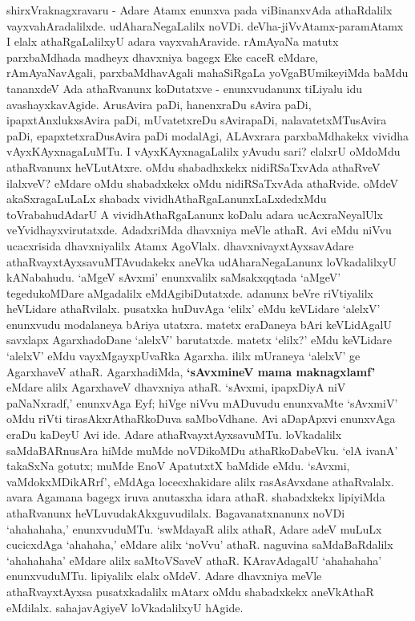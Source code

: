 shirxVraknagxravaru - Adare Atamx enunxva pada viBinanxvAda athaRdalilx vayxvahAradalilxde. udAharaNegaLalilx noVDi. deVha-jiVvAtamx-paramAtamx I elalx athaRgaLalilxyU adara vayxvahAravide. rAmAyaNa matutx parxbaMdhada madheyx dhavxniya bagegx Eke caceR eMdare, rAmAyaNavAgali, parxbaMdhavAgali mahaSiRgaLa yoVgaBUmikeyiMda baMdu tananxdeV Ada athaRvanunx koDutatxve - enunxvudanunx tiLiyalu idu avashayxkavAgide. ArusAvira paDi, hanenxraDu sAvira paDi, ipapxtAnxlukxsAvira paDi, mUvatetxreDu sAvirapaDi, nalavatetxMTusAvira paDi, epapxtetxraDusAvira paDi modalAgi, ALAvxrara parxbaMdhakekx vividha vAyxKAyxnagaLuMTu. I vAyxKAyxnagaLalilx yAvudu sari? elalxrU oMdoMdu athaRvanunx heVLutAtxre. oMdu shabadhxkekx nidiRSaTxvAda athaRveV ilalxveV? eMdare oMdu shabadxkekx oMdu nidiRSaTxvAda athaRvide. oMdeV akaSxragaLuLaLx shabadx vividhAthaRgaLanunxLaLxdedxMdu toVrabahudAdarU A vividhAthaRgaLanunx koDalu adara ucAcxraNeyalUlx veYvidhayxvirutatxde. AdadxriMda dhavxniya meVle athaR. Avi eMdu niVvu ucacxrisida dhavxniyalilx Atamx AgoVlalx. dhavxnivayxtAyxsavAdare athaRvayxtAyxsavuMTAvudakekx aneVka udAharaNegaLanunx loVkadalilxyU kANabahudu. `aMgeV sAvxmi' enunxvalilx saMsakxqqtada `aMgeV' tegedukoMDare aMgadalilx eMdAgibiDutatxde. adanunx beVre riVtiyalilx heVLidare athaRvilalx. pusatxka huDuvAga `elilx' eMdu keVLidare `alelxV' enunxvudu modalaneya bAriya utatxra. matetx eraDaneya bAri keVLidAgalU savxlapx AgarxhadoDane `alelxV' barutatxde. matetx `elilx?' eMdu keVLidare `alelxV' eMdu vayxMgayxpUvaRka Agarxha. ililx mUraneya `alelxV' ge AgarxhaveV athaR. AgarxhadiMda, {\bf `sAvxmineV mama maknagxlamf'}\label{234} eMdare alilx AgarxhaveV dhavxniya athaR. `sAvxmi, ipapxDiyA niV paNaNxradf,' enunxvAga Eyf; hiVge niVvu mADuvudu enunxvaMte `sAvxmiV' oMdu riVti tirasAkxrAthaRkoDuva saMboVdhane. Avi aDapApxvi enunxvAga eraDu kaDeyU Avi ide. Adare athaRvayxtAyxsavuMTu. loVkadalilx saMdaBARnusAra hiMde muMde noVDikoMDu athaRkoDabeVku. `elA ivanA' takaSxNa gotutx; muMde EnoV ApatutxtX baMdide eMdu. `sAvxmi, vaMdokxMDikARrf', eMdAga locecxhakidare alilx rasAsAvxdane athaRvalalx. avara Agamana bagegx iruva anutasxha idara athaR. shabadxkekx lipiyiMda athaRvanunx heVLuvudakAkxguvudilalx. Bagavanatxnanunx noVDi `ahahahaha,' enunxvuduMTu. `swMdayaR alilx athaR, Adare adeV muLuLx  cucicxdAga `ahahaha,' eMdare alilx `noVvu' athaR. naguvina saMdaBaRdalilx `ahahahaha' eMdare alilx saMtoVSaveV athaR. KAravAdagalU `ahahahaha' enunxvuduMTu. lipiyalilx elalx oMdeV. Adare dhavxniya meVle athaRvayxtAyxsa pusatxkadalilx mAtarx oMdu shabadxkekx aneVkAthaR eMdilalx. sahajavAgiyeV loVkadalilxyU hAgide. 

